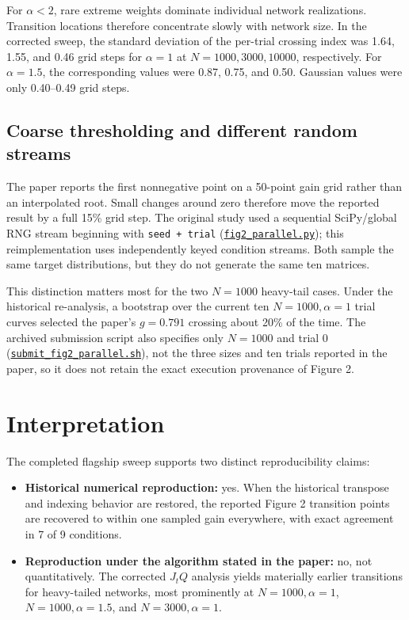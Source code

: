 \documentclass[11pt]{article}
\begin{document}
For $\alpha<2$, rare extreme weights dominate individual network
realizations. Transition locations therefore concentrate slowly with network
size. In the corrected sweep, the standard deviation of the per-trial crossing
index was 1.64, 1.55, and 0.46 grid steps for $\alpha=1$ at
$N=1000,3000,10000$, respectively. For $\alpha=1.5$, the corresponding
values were 0.87, 0.75, and 0.50. Gaussian values were only 0.40--0.49 grid
steps.

\subsection{Coarse thresholding and different random streams}

The paper reports the first nonnegative point on a 50-point gain grid rather
than an interpolated root. Small changes around zero therefore move the
reported result by a full 15\% grid step. The original study used a sequential
SciPy/global RNG stream beginning with \texttt{seed + trial}
(\href{original/run_figs/fig2_parallel.py\#L39-L64}{\texttt{fig2\_parallel.py}}); this
reimplementation uses independently keyed condition streams. Both sample the
same target distributions, but they do not generate the same ten matrices.

This distinction matters most for the two $N=1000$ heavy-tail cases. Under
the historical re-analysis, a bootstrap over the current ten
$N=1000,\alpha=1$ trial curves selected the paper's $g=0.791$ crossing about
20\% of the time. The archived submission script also specifies only
$N=1000$ and trial 0
(\href{original/submit_jobs/submit_fig2_parallel.sh\#L5-L9}{\texttt{submit\_fig2\_parallel.sh}}),
not the three sizes and ten trials reported in the paper, so it does not retain
the exact execution provenance of Figure 2.

\section{Interpretation}

The completed flagship sweep supports two distinct reproducibility claims:

\begin{itemize}
\item \textbf{Historical numerical reproduction:} yes. When the historical transpose
and indexing behavior are restored, the reported Figure 2 transition points
are recovered to within one sampled gain everywhere, with exact agreement in
7 of 9 conditions.
\item \textbf{Reproduction under the algorithm stated in the paper:} no, not
quantitatively. The corrected $J_tQ$ analysis yields materially earlier
transitions for heavy-tailed networks, most prominently at
$N=1000,\alpha=1$, $N=1000,\alpha=1.5$, and $N=3000,\alpha=1$.
\end{itemize}
\end{document}

